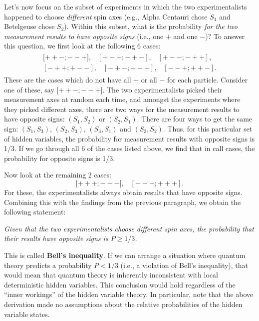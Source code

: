 \documentclass[pra,12pt]{revtex4}
\begin{document}
Let's now focus on the subset of experiments in which the two
experimentalists happened to choose \textit{different} spin axes
(e.g., Alpha Centauri chose $S_1$ and Betelgeuse chose $S_2$).  Within
this subset, what is the probability \textit{for the two measurement
  results to have opposite signs} (i.e., one $+$ and one $-$)?  To
answer this question, we first look at the following 6 cases:
\begin{align*}
  \begin{aligned}{[}{++-};{--+}], \;\;\; [{+-+};{-+-}], \;\;\; [{+--};{-++}],\\ [{-++};{+--}], \;\;\; [{-+-};{+-+}], \;\;\; [{--+};{++-}].\end{aligned}
\end{align*}
These are the cases which do not have all $+$ or all $-$ for each
particle.  Consider one of these, say ${[}{++-};{--+}]$.  The two
experimentalists picked their measurement axes at random each time,
and amongst the experiments where they picked different axes, there
are two ways for the measurement results to have opposite signs:
$(S_1,S_2)$ or $(S_2,S_1)$.  There are four ways to get the same sign:
$(S_1,S_3)$, $(S_2,S_3)$, $(S_3,S_1)$ and $(S_3, S_2)$.  Thus,
for this particular set of hidden variables, the probability for
measurement results with opposite signs is 1/3.  If we go through all
6 of the cases listed above, we find that in call cases, the
probability for opposite signs is 1/3.

Now look at the remaining 2 cases:
\begin{equation*}
  {[}{+++};{---}], \;\;\; [{---};{+++}].
\end{equation*}
For these, the experimentalists always obtain results that have
opposite signs.  Combining this with the findings from the previous
paragraph, we obtain the following statement:

\textit{Given that the two experimentalists choose different spin
  axes, the probability that their results have opposite signs is $P
  \ge 1/3$.}

This is called \textbf{Bell's inequality}.  If we can arrange a
situation where quantum theory predicts a probability $P < 1/3$ (i.e.,
a violation of Bell's inequality), that would mean that quantum theory
is inherently inconsistent with local deterministic hidden variables.
This conclusion would hold regardless of the ``inner workings'' of the
hidden variable theory.  In particular, note that the above derivation
made no assumptions about the relative probabilities of the hidden
variable states.
\end{document}
